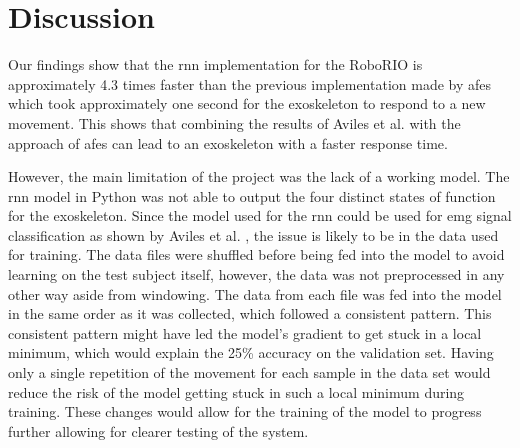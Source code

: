 \section{Discussion}
\label{section:disc}

%
%        
%
%
%
%
%
%

Our findings show that the \acrshort{rnn} implementation for the RoboRIO is approximately 4.3 times faster
than the previous implementation made by \acrshort{afes} which took approximately one second for the exoskeleton to respond to a new movement. 
This shows that combining the results of Aviles et al. \cite{RNNEMG} with the approach of \acrshort{afes} \cite{AFES} 
can lead to an exoskeleton with a faster response time.

However, the main limitation of the project was the lack of a working model. The \acrshort{rnn} model in Python was not able to output the 
four distinct states of function for the exoskeleton. Since the model used for the \acrshort{rnn} could be used for \acrshort{emg} signal
classification as shown by Aviles et al. \cite{RNNEMG}, the issue is likely to be in the data used for training. The data files were
shuffled before being fed into the model to avoid learning on the test subject itself, however, the data was not preprocessed in any other way
aside from windowing. The data from each file was fed into the model in the same order as it was collected, which followed a consistent pattern.
This consistent pattern might have led the model's gradient to get stuck in a local minimum, which would explain the 25\% accuracy on the 
validation set. Having only a single repetition of the movement for each sample in the data set would reduce the risk of the model getting 
stuck in such a local minimum during training. These changes would allow for the training of the model to progress further allowing for 
clearer testing of the system.

